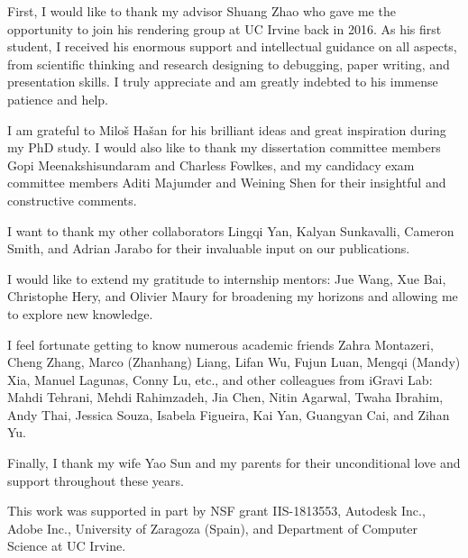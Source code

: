 \acknowledgments
{
First, I would like to thank my advisor Shuang Zhao who gave me the opportunity to join his rendering group at UC Irvine back in 2016. As his first student, I received his enormous support and intellectual guidance on all aspects, from scientific thinking and research designing to debugging, paper writing, and presentation skills. I truly appreciate and am greatly indebted to his immense patience and help.


I am grateful to Milo\v{s} Ha\v{s}an for his brilliant ideas and great inspiration during my PhD study. I would also like to thank my dissertation committee members Gopi Meenakshisundaram and Charless Fowlkes, and my candidacy exam committee members Aditi Majumder and Weining Shen for their insightful and constructive comments. 


I want to thank my other collaborators Lingqi Yan, Kalyan Sunkavalli, Cameron Smith, and Adrian Jarabo for their invaluable input on our publications.  


I would like to extend my gratitude to internship mentors: Jue Wang, Xue Bai, Christophe Hery, and Olivier Maury for broadening my horizons and allowing me to explore new knowledge. 


I feel fortunate getting to know numerous academic friends Zahra Montazeri, Cheng Zhang, Marco (Zhanhang) Liang, Lifan Wu, Fujun Luan, Mengqi (Mandy) Xia, Manuel Lagunas, Conny Lu, etc., and other colleagues from iGravi Lab: Mahdi Tehrani, Mehdi Rahimzadeh, Jia Chen, Nitin Agarwal, Twaha Ibrahim, Andy Thai, Jessica Souza, Isabela Figueira, Kai Yan, Guangyan Cai, and Zihan Yu. 


Finally, I thank my wife Yao Sun and my parents for their unconditional love and support throughout these years.


This work was supported in part by NSF grant IIS-1813553, Autodesk Inc., Adobe Inc., University of Zaragoza (Spain), and Department of Computer Science at UC Irvine. 
  
}


\newcommand{\mypubentry}[3]{
  \begin{tabular*}{1\textwidth}{@{\extracolsep{\fill}}p{4.5in}r}
    \textbf{#1} & \textbf{#2} \\ 
    \multicolumn{2}{@{\extracolsep{\fill}}p{.95\textwidth}}{#3}\vspace{6pt} \\
  \end{tabular*}
}
\newcommand{\mysoftentry}[3]{
  \begin{tabular*}{1\textwidth}{@{\extracolsep{\fill}}lr}
    \textbf{#1} & \url{#2} \\
    \multicolumn{2}{@{\extracolsep{\fill}}p{.95\textwidth}}
    {\emph{#3}}\vspace{-6pt} \\
  \end{tabular*}
}

